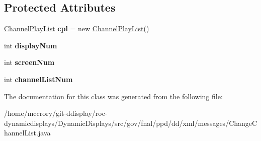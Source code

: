 \subsection*{Protected Attributes}
\begin{DoxyCompactItemize}
\item 
\hypertarget{classgov_1_1fnal_1_1ppd_1_1dd_1_1xml_1_1messages_1_1ChangeChannelList_a80d69dad3db10d90afcb29580f1eb95e}{\hyperlink{classgov_1_1fnal_1_1ppd_1_1dd_1_1channel_1_1ChannelPlayList}{Channel\-Play\-List} {\bfseries cpl} = new \hyperlink{classgov_1_1fnal_1_1ppd_1_1dd_1_1channel_1_1ChannelPlayList}{Channel\-Play\-List}()}\label{classgov_1_1fnal_1_1ppd_1_1dd_1_1xml_1_1messages_1_1ChangeChannelList_a80d69dad3db10d90afcb29580f1eb95e}

\item 
\hypertarget{classgov_1_1fnal_1_1ppd_1_1dd_1_1xml_1_1messages_1_1ChangeChannelList_a0aa72cb7a63f2139bb7e18c9643a9f54}{int {\bfseries display\-Num}}\label{classgov_1_1fnal_1_1ppd_1_1dd_1_1xml_1_1messages_1_1ChangeChannelList_a0aa72cb7a63f2139bb7e18c9643a9f54}

\item 
\hypertarget{classgov_1_1fnal_1_1ppd_1_1dd_1_1xml_1_1messages_1_1ChangeChannelList_a854dc25a06aa4b550596c8bfe3e1d45d}{int {\bfseries screen\-Num}}\label{classgov_1_1fnal_1_1ppd_1_1dd_1_1xml_1_1messages_1_1ChangeChannelList_a854dc25a06aa4b550596c8bfe3e1d45d}

\item 
\hypertarget{classgov_1_1fnal_1_1ppd_1_1dd_1_1xml_1_1messages_1_1ChangeChannelList_aaaefc4dea4e775fa76f0ff78df36dc4c}{int {\bfseries channel\-List\-Num}}\label{classgov_1_1fnal_1_1ppd_1_1dd_1_1xml_1_1messages_1_1ChangeChannelList_aaaefc4dea4e775fa76f0ff78df36dc4c}

\end{DoxyCompactItemize}


The documentation for this class was generated from the following file\-:\begin{DoxyCompactItemize}
\item 
/home/mccrory/git-\/ddisplay/roc-\/dynamicdisplays/\-Dynamic\-Displays/src/gov/fnal/ppd/dd/xml/messages/Change\-Channel\-List.\-java\end{DoxyCompactItemize}

